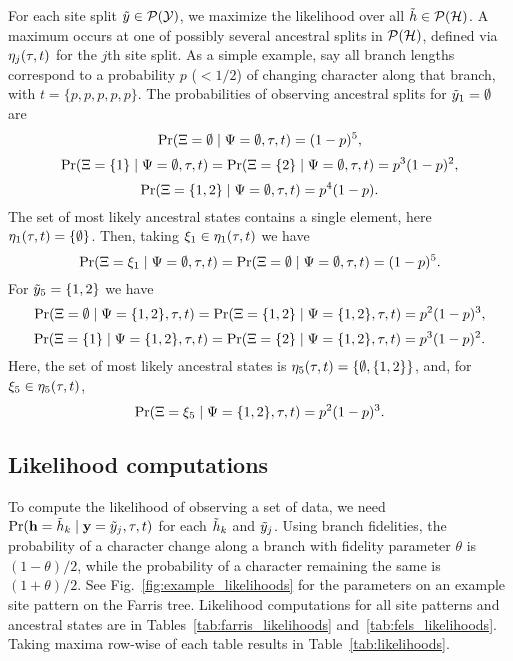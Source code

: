 For each site split $\tilde{y}\in\mathcal{P}(\mathcal{Y})$, we maximize the likelihood over all $\tilde{h}\in\mathcal{P}(\mathcal{H})$.
A maximum occurs at one of possibly several ancestral splits in $\mathcal{P}(\mathcal{H})$, defined via $\eta_j(\tau, t)$ for the $j$th site split.
As a simple example, say all branch lengths correspond to a probability $p$ ($< 1/2$) of changing character along that branch, with $t=\{p,p,p,p,p\}$.
The probabilities of observing ancestral splits for $\tilde{y}_1=\emptyset$ are
$$
\Pr(\Xi=\emptyset \mid \Psi=\emptyset, \tau, t) =
(1-p)^5,
$$
$$
\Pr(\Xi=\{1\} \mid \Psi=\emptyset, \tau, t) =
\Pr(\Xi=\{2\} \mid \Psi=\emptyset, \tau, t) =
p^3(1-p)^2,
$$
$$
\Pr(\Xi=\{1,2\} \mid \Psi=\emptyset, \tau, t) =
p^4(1-p).
$$
The set of most likely ancestral states contains a single element, here $\eta_1(\tau, t)=\{\emptyset\}$.
Then, taking $\xi_1\in\eta_1(\tau, t)$ we have
$$
\Pr(\Xi=\xi_1 \mid \Psi=\emptyset, \tau, t) =
\Pr(\Xi=\emptyset \mid \Psi=\emptyset, \tau, t) =
(1-p)^5.
$$
For $\tilde{y}_5=\{1,2\}$ we have
$$
\Pr(\Xi=\emptyset \mid \Psi=\{1,2\}, \tau, t) =
\Pr(\Xi=\{1,2\} \mid \Psi=\{1,2\}, \tau, t) =
p^2(1-p)^3,
$$
$$
\Pr(\Xi=\{1\} \mid \Psi=\{1,2\}, \tau, t) =
\Pr(\Xi=\{2\} \mid \Psi=\{1,2\}, \tau, t) =
p^3(1-p)^2.
$$
Here, the set of most likely ancestral states is $\eta_5(\tau, t)=\{\emptyset,\{1,2\}\}$, and, for $\xi_5\in\eta_5(\tau, t)$,
$$
\Pr(\Xi=\xi_5 \mid \Psi=\{1,2\}, \tau, t) =
p^2(1-p)^3.
$$

\subsection*{Likelihood computations}

To compute the likelihood of observing a set of data, we need $\Pr(\mathbf{h}=\tilde{h}_k\mid \mathbf{y}=\tilde{y}_j,\tau,t)$ for each $\tilde{h}_k$ and $\tilde{y}_j$.
Using branch fidelities, the probability of a character change along a branch with fidelity parameter $\theta$ is $(1-\theta)/2$, while the probability of a character remaining the same is $(1+\theta)/2$.
See Fig.~\ref{fig:example_likelihoods} for the parameters on an example site pattern on the Farris tree.
Likelihood computations for all site patterns and ancestral states are in Tables~\ref{tab:farris_likelihoods} and~\ref{tab:fels_likelihoods}.
Taking maxima row-wise of each table results in Table~\ref{tab:likelihoods}.

